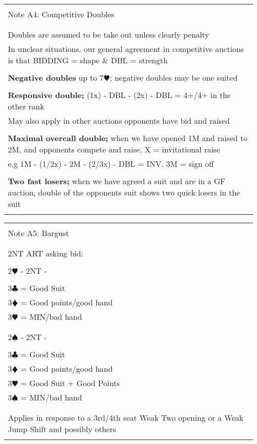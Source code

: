 \documentclass{article}
\newcommand\C{\ensuremath{\clubsuit}}
\newcommand\D{\color{red}\ensuremath{\vardiamondsuit}}
\renewcommand\H{\color{red}\ensuremath{\varheartsuit}}
\renewcommand\S{\ensuremath{\spadesuit}}
\newcommand\N{{\footnotesize NT}}
\begin{document}
\begin{tabular}{|l|}
\hline \\[-1em]
\cellcolor{green!25} \Large Note A4: Competitive Doubles \\[-1em] 
\\ \hline
\\ 
\Large Doubles are assumed to be take out unless clearly penalty \\
\Large In unclear situations. our general agreement in competitive auctions is that BIDDING = shape \& DBL = strength \\
\\
\Large \textbf{Negative doubles} up to 7{\H}; negative doubles may be one suited \\
\\
\Large \textbf{Responsive double;} (1x) - DBL - (2x) - DBL = 4+/4+ in the other rank \\
\large May also apply in other auctions opponents have bid and raised \\
\\
\Large \textbf{Maximal overcall double;} when we have opened 1M and raised to 2M, and opponents compete and raise, X = invitational raise \\
\large e.g 1M - (1/2x) - 2M - (2/3x) - DBL = INV, 3M = sign off \\
\\
\Large \textbf{Two fast losers;} when we have agreed a suit and are in a GF auction, double of the opponents suit shows two quick losers in the suit \\
\\ \hline
\end{tabular}

\begin{tabular}{|l|}
\hline \\[-1em]
\cellcolor{green!25} \Large Note A5: Bargust \\[-1em] 
\\ \hline
\\ \Large 2{\N} ART asking bid: \\
\\ \Large 2{\H} - 2{\N} - \\
\\ \Large {3\C} = Good Suit
\\ \Large {3\D} = Good points/good hand
\\ \Large {3\H} = MIN/bad hand \\
\\
\\ \Large 2{\S} - 2{\N} - \\
\\ \Large {3\C} = Good Suit
\\ \Large {3\D} = Good points/good hand
\\ \Large {3\H} = Good Suit + Good Points
\\ \Large {3\S} = MIN/bad hand \\
\\
\\ \Large Applies in response to a 3rd/4th seat Weak Two opening or a Weak Jump Shift and possibly others \\ 
\\ \hline
\end{tabular}
\end{document}
